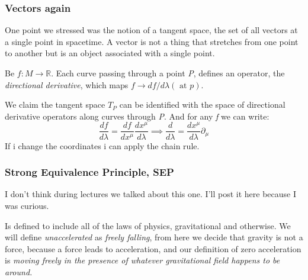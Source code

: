 \subsubsection{Vectors again}
One point we stressed was the notion of a tangent space, the set of all vectors at a single point in spacetime. A vector is not a thing that stretches from one point to another but is an object associated with a single point. \par
Be $f : M \to \mathbb{R}$. Each curve passing through a point \emph{P}, defines an operator, the \emph{ directional derivative}, which maps $f \to df/d\lambda \left( \text{ at }p \right)$. \par
We claim the tangent space $T_{P}$ can be identified with the space of directional derivative operators along curves through \emph{P}.
And for any \emph{f} we can write:
\[
\frac{df}{d\lambda } = \frac{df}{dx^{\mu }} \frac{dx^{\mu }}{d\lambda } \implies \frac{d}{d\lambda } = \frac{dx^{\mu }}{d\lambda } \partial_{\mu }
\]
If i change the coordinates i can apply the chain rule.



\subsubsection{Strong Equivalence Principle, SEP}
I don't think during lectures we talked about this one. I'll post it here because I was curious.\par

Is defined to include all of the laws of physics, gravitational and otherwise.
We will define \emph{unaccelerated} as \emph{freely falling}, from here we decide that gravity is not a force, because a force leads to acceleration, and our definition of zero acceleration is \emph{ moving freely in the presence of whatever gravitational field happens to be around.} \par


